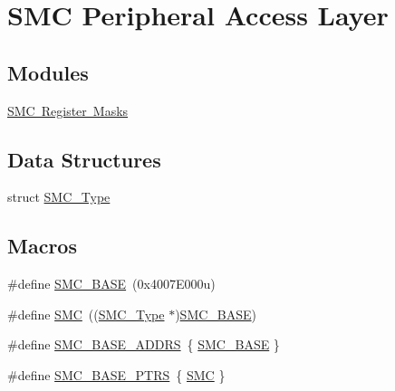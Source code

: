 \hypertarget{group___s_m_c___peripheral___access___layer}{}\section{S\+MC Peripheral Access Layer}
\label{group___s_m_c___peripheral___access___layer}
\subsection*{Modules}
\begin{DoxyCompactItemize}
\item 
\mbox{\hyperlink{group___s_m_c___register___masks}{S\+M\+C Register Masks}}
\end{DoxyCompactItemize}
\subsection*{Data Structures}
\begin{DoxyCompactItemize}
\item 
struct \mbox{\hyperlink{struct_s_m_c___type}{S\+M\+C\+\_\+\+Type}}
\end{DoxyCompactItemize}
\subsection*{Macros}
\begin{DoxyCompactItemize}
\item 
\#define \mbox{\hyperlink{group___s_m_c___peripheral___access___layer_ga683c9b3b5d9d94fb1ac7c4c18f5aff44}{S\+M\+C\+\_\+\+B\+A\+SE}}~(0x4007\+E000u)
\item 
\#define \mbox{\hyperlink{group___s_m_c___peripheral___access___layer_ga6667e81e5b32250febd3d46511d9309d}{S\+MC}}~((\mbox{\hyperlink{struct_s_m_c___type}{S\+M\+C\+\_\+\+Type}} $\ast$)\mbox{\hyperlink{group___s_m_c___peripheral___access___layer_ga683c9b3b5d9d94fb1ac7c4c18f5aff44}{S\+M\+C\+\_\+\+B\+A\+SE}})
\item 
\#define \mbox{\hyperlink{group___s_m_c___peripheral___access___layer_ga1378b926401c2f7a44f4238a027ff8c2}{S\+M\+C\+\_\+\+B\+A\+S\+E\+\_\+\+A\+D\+D\+RS}}~\{ \mbox{\hyperlink{group___s_m_c___peripheral___access___layer_ga683c9b3b5d9d94fb1ac7c4c18f5aff44}{S\+M\+C\+\_\+\+B\+A\+SE}} \}
\item 
\#define \mbox{\hyperlink{group___s_m_c___peripheral___access___layer_gae583f3f0917ee513adcac36dd042a5f3}{S\+M\+C\+\_\+\+B\+A\+S\+E\+\_\+\+P\+T\+RS}}~\{ \mbox{\hyperlink{group___s_m_c___peripheral___access___layer_ga6667e81e5b32250febd3d46511d9309d}{S\+MC}} \}
\end{DoxyCompactItemize}


